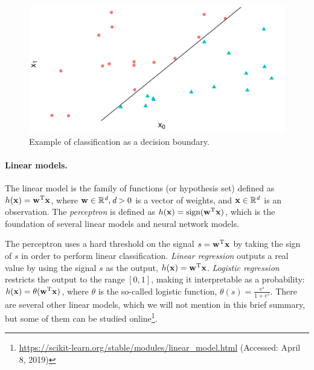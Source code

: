 %
\begin{figure}
    \centering
    \includegraphics[width=.8\textwidth]{figures/background/classification-example}
    \caption{Example of classification as a decision boundary.}
    \label{background:fig:clf-ex}
\end{figure}%


\paragraph{Linear models.} The linear model is the family of functions (or
hypothesis set) defined as $h(\boldsymbol{\mathbf{x}}) = \boldsymbol{\mathbf{w}}^{\text{T}}\boldsymbol{\mathbf{x}}$, where
$\boldsymbol{\mathbf{w}} \in \mathbb{R}^\textit{d}, \textit{d} > 0$ is a vector of weights, and
$\boldsymbol{\mathbf{x}}\in \mathbb{R}^\textit{d}$ is an observation. 
%
The {\em perceptron} is defined as $h(\boldsymbol{\mathbf{x}}) =
\text{sign}(\boldsymbol{\mathbf{w}}^{\text{T}}\boldsymbol{\mathbf{x}})$, which is the foundation of several
linear models and neural network models.


The perceptron uses a hard threshold on the signal $s =
\boldsymbol{\mathbf{w}}^{\text{T}}\boldsymbol{\mathbf{x}}$ by taking the sign of $s$ in order to perform linear
classification.
%
{\em Linear regression} outputs a real value by using the signal $s$ as the
output, $h(\boldsymbol{\mathbf{x}}) = \boldsymbol{\mathbf{w}}^{\text{T}}\boldsymbol{\mathbf{x}}$.
%
{\em Logistic regression} restricts the output to the range $[0, 1]$, making
it interpretable as a probability: $h(\boldsymbol{\mathbf{x}}) =
\theta(\boldsymbol{\mathbf{w}}^{\text{T}}\boldsymbol{\mathbf{x}})$, where $\theta$ is the so-called logistic
function, $\theta(s) = \frac{e^s}{1 + e^s}$.
%
There are several other linear models, which we will not mention in this brief
summary, but some of them can be studied
online\footnote{\url{https://scikit-learn.org/stable/modules/linear_model.html}
(Accessed: April 8, 2019)}.


